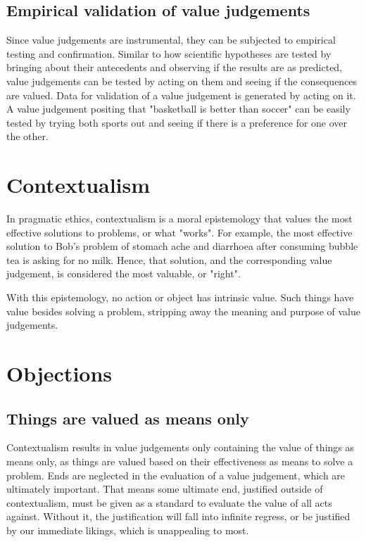 \documentclass[11pt]{article}
\begin{document}
\subsection{Empirical validation of value judgements}
\label{sec:org60f8e38}
Since value judgements are instrumental, they can be subjected
to empirical testing and confirmation.
Similar to how scientific hypotheses are tested by bringing
about their antecedents and observing if the results are as predicted,
value judgements can be tested by acting on them
and seeing if the consequences are valued.
Data for validation of a value judgement is generated by acting on it.
A value judgement positing that "basketball is better than soccer"
can be easily tested by trying both sports out and seeing if
there is a preference for one over the other.
\section{Contextualism}
\label{sec:org9cfe1f0}
In pragmatic ethics, contextualism is a moral epistemology
that values the most effective solutions to problems, or what "works".
For example, the most effective solution to Bob's
problem of stomach ache and diarrhoea after consuming
bubble tea is asking for no milk.
Hence, that solution, and the corresponding value judgement,
is considered the most valuable, or "right".

With this epistemology, no action or object has intrinsic value.
Such things have value besides solving a problem,
stripping away the meaning and purpose of value judgements.
\section{Objections}
\label{sec:org98db025}

\subsection{Things are valued as means only}
\label{sec:orgd948d4a}
Contextualism results in value judgements only
containing the value of things as means only,
as things are valued based on their effectiveness
as means to solve a problem.
Ends are neglected in the evaluation of a value judgement,
which are ultimately important.
That means some ultimate end, justified outside of contextualism,
must be given as a standard to evaluate the value of all acts against.
Without it, the justification will fall into infinite regress,
or be justified by our immediate likings,
which is unappealing to most.
\end{document}
